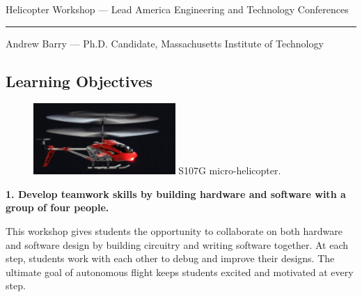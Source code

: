 \documentclass[11pt]{article}
\begin{document}
\thispagestyle{empty}
\pagestyle{empty}

{\LARGE Helicopter Workshop --- Lead America Engineering and Technology Conferences}
\vspace{10pt}
\hrule
\vspace{5pt}
Andrew Barry --- Ph.D. Candidate, Massachusetts Institute of Technology

\subsection*{Learning Objectives}

\begin{figure}
    \begin{center}
    \includegraphics[width=0.48\textwidth]{figures/S107G.jpg}
    {\small S107G micro-helicopter.\footnotemark}
    \end{center}
    \vspace{-20pt}
\end{figure}
\textbf{1. Develop teamwork skills by building hardware and software with a group of four people.}

This workshop gives students the opportunity to collaborate on both hardware and software design by building circuitry and writing software together.  At each step, students work with each other to debug and improve their designs.  The ultimate goal of autonomous flight keeps students excited and motivated at every step.
\end{document}
